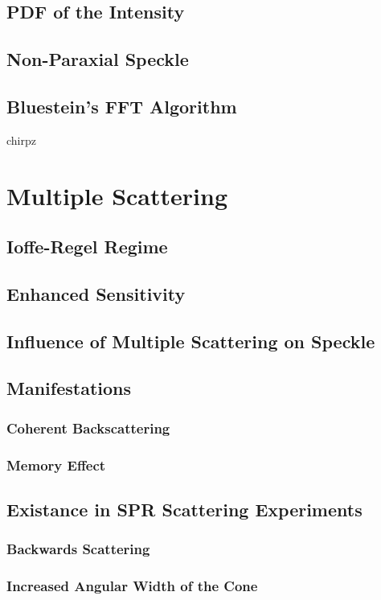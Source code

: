 \documentclass[a4paper,titlepage,onecolumn]{report}
\begin{document}
  \subsection{PDF of the Intensity}
  \subsection{Non-Paraxial Speckle}
		\subsection{Bluestein's FFT Algorithm}
		{chirpz}
 \section{Multiple Scattering}
  \subsection{Ioffe-Regel Regime}
  \subsection{Enhanced Sensitivity}
  \subsection{Influence of Multiple Scattering on Speckle}
  \subsection{Manifestations}
   \subsubsection{Coherent Backscattering}
   \subsubsection{Memory Effect}
  \subsection{Existance in SPR Scattering Experiments}
   \subsubsection{Backwards Scattering}
   \subsubsection{Increased Angular Width of the Cone}
\end{document}

